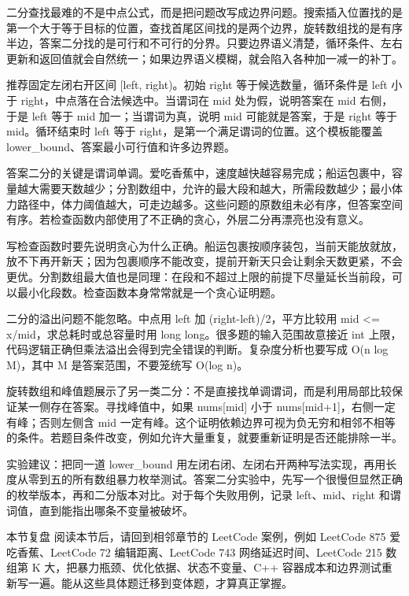 
二分查找最难的不是中点公式，而是把问题改写成边界问题。搜索插入位置找的是第一个大于等于目标的位置，查找首尾区间找的是两个边界，旋转数组找的是有序半边，答案二分找的是可行和不可行的分界。只要边界语义清楚，循环条件、左右更新和返回值就会自然统一；如果边界语义模糊，就会陷入各种加一减一的补丁。

推荐固定左闭右开区间 [left, right)。初始 right 等于候选数量，循环条件是 left 小于 right，中点落在合法候选中。当谓词在 mid 处为假，说明答案在 mid 右侧，于是 left 等于 mid 加一；当谓词为真，说明 mid 可能就是答案，于是 right 等于 mid。循环结束时 left 等于 right，是第一个满足谓词的位置。这个模板能覆盖 lower\_bound、答案最小可行值和许多边界题。

答案二分的关键是谓词单调。爱吃香蕉中，速度越快越容易完成；船运包裹中，容量越大需要天数越少；分割数组中，允许的最大段和越大，所需段数越少；最小体力路径中，体力阈值越大，可走边越多。这些问题的原数组未必有序，但答案空间有序。若检查函数内部使用了不正确的贪心，外层二分再漂亮也没有意义。

写检查函数时要先说明贪心为什么正确。船运包裹按顺序装包，当前天能放就放，放不下再开新天；因为包裹顺序不能改变，提前开新天只会让剩余天数更紧，不会更优。分割数组最大值也是同理：在段和不超过上限的前提下尽量延长当前段，可以最小化段数。检查函数本身常常就是一个贪心证明题。

二分的溢出问题不能忽略。中点用 left 加 (right-left)/2，平方比较用 mid <= x/mid，求总耗时或总容量时用 long long。很多题的输入范围故意接近 int 上限，代码逻辑正确但乘法溢出会得到完全错误的判断。复杂度分析也要写成 O(n log M)，其中 M 是答案范围，不要笼统写 O(log n)。

旋转数组和峰值题展示了另一类二分：不是直接找单调谓词，而是利用局部比较保证某一侧存在答案。寻找峰值中，如果 nums[mid] 小于 nums[mid+1]，右侧一定有峰；否则左侧含 mid 一定有峰。这个证明依赖边界可视为负无穷和相邻不相等的条件。若题目条件改变，例如允许大量重复，就要重新证明是否还能排除一半。

实验建议：把同一道 lower\_bound 用左闭右闭、左闭右开两种写法实现，再用长度从零到五的所有数组暴力枚举测试。答案二分实验中，先写一个很慢但显然正确的枚举版本，再和二分版本对比。对于每个失败用例，记录 left、mid、right 和谓词值，直到能指出哪条不变量被破坏。

\begin{principlebox}{本节复盘}
阅读本节后，请回到相邻章节的 LeetCode 案例，例如 LeetCode 875 爱吃香蕉、LeetCode 72 编辑距离、LeetCode 743 网络延迟时间、LeetCode 215 数组第 K 大，把暴力瓶颈、优化依据、状态不变量、C++ 容器成本和边界测试重新写一遍。能从这些具体题迁移到变体题，才算真正掌握。
\end{principlebox}
